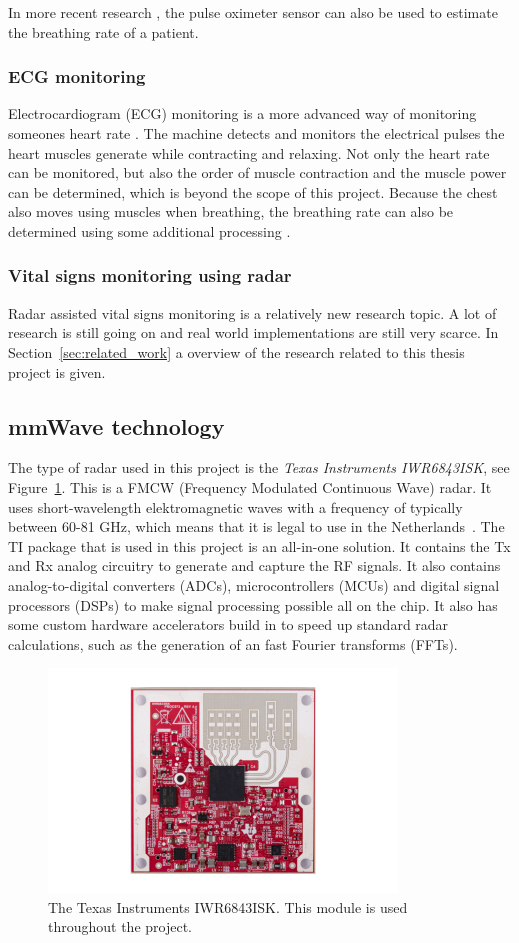 In more recent research \cite{motin2019selection}, the pulse oximeter sensor can also be used to estimate the breathing rate of a patient. 

\subsubsection{ECG monitoring}
Electrocardiogram (ECG) monitoring is a more advanced way of monitoring someones heart rate \cite{berkaya2018survey}. The machine detects and monitors the electrical pulses the heart muscles generate while contracting and relaxing. Not only the heart rate can be monitored, but also the order of muscle contraction and the muscle power can be determined, which is beyond the scope of this project. Because the chest also moves using muscles when breathing, the breathing rate can also be determined using some additional processing \cite{charlton2017breathing}.

\subsubsection{Vital signs monitoring using radar}
Radar assisted vital signs monitoring is a relatively new research topic. A lot of research is still going on and real world implementations are still very scarce. In Section~\ref{sec:related_work} a overview of the research related to this thesis project is given.  

\subsection{mmWave technology}
\label{sec:mmwave_tech}
The type of radar used in this project is the \emph{Texas Instruments IWR6843ISK}, see Figure~\ref{fig:iwr6843isk}. This is a FMCW (Frequency Modulated Continuous Wave) radar. It uses short-wavelength elektromagnetic waves with a frequency of typically between 60-81 GHz, which means that it is legal to use in the Netherlands~\cite{freq_plan}. The TI package that is used in this project is an all-in-one solution. It contains the Tx and Rx analog circuitry to generate and capture the RF signals. It also contains analog-to-digital converters (ADCs), microcontrollers (MCUs) and digital signal processors (DSPs) to make signal processing possible all on the chip. It also has some custom hardware accelerators build in to speed up standard radar calculations, such as the generation of an fast Fourier transforms (FFTs).

\begin{figure}[t]
\centering
\includegraphics[width=.5\textwidth]{figures/background/iwr6843isk.jpg}
\caption{The Texas Instruments IWR6843ISK. This module is used throughout the project.}
\label{fig:iwr6843isk}
\end{figure}


